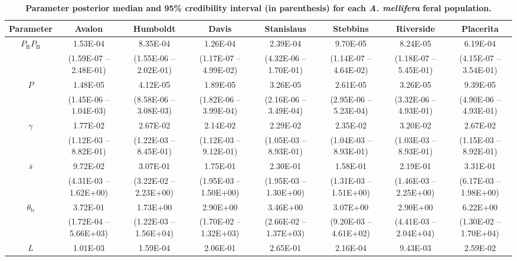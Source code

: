 \documentclass[a4paper, 12pt]{article}
\begin{document}
 \begin{table}
 \begin{small}
 \caption{\textbf{\small Parameter posterior median and 95\% credibility interval (in parenthesis) for each  \textit{A. mellifera} feral population.}}
 \end{small}
   \begin{tiny}
    \begin{tabular}{cccccccc}
    \cmidrule(r){1-8}
        Parameter & Avalon & Humboldt & Davis & Stanislaus & Stebbins & Riverside & Placerita \\
        \midrule
        $P_\mathrm{R}P_\mathrm{B}$  & 1.53E-04 & 8.35E-04 & 1.26E-04 & 2.39E-04 & 9.70E-05 & 8.24E-05 & 6.19E-04 \\
         & (1.59E-07 – 2.48E-01) & (1.55E-06 – 2.02E-01) & (1.17E-07 – 4.99E-02) & (4.32E-06 – 1.70E-01) & (1.14E-07 – 4.64E-02) & (1.18E-07 – 5.45E-01) & (4.15E-07 – 3.54E-01) \\
        $P$ & 1.48E-05 & 4.12E-05 & 1.89E-05 & 3.26E-05 & 2.61E-05 & 3.26E-05 & 9.39E-05 \\
         & (1.45E-06 – 1.04E-03) & (8.58E-06 – 3.08E-03) & (1.82E-06 – 3.99E-04) & (2.16E-06 – 3.49E-04) & (2.95E-06 – 5.23E-04) & (3.32E-06 – 4.93E-01) & (4.90E-06 – 4.93E-01) \\
        $\gamma$ & 1.77E-02 & 2.67E-02 & 2.14E-02 & 2.29E-02 & 2.35E-02 & 3.20E-02 & 2.67E-02 \\
         & (1.12E-03 – 8.82E-01) & (1.22E-03 – 8.45E-01) & (1.12E-03 – 9.12E-01) & (1.05E-03 – 8.93E-01) & (1.04E-03 – 8.93E-01) & (1.03E-03 – 8.93E-01) & (1.15E-03 – 8.92E-01) \\
        $\bar{s}$ & 9.72E-02 & 3.07E-01 & 1.75E-01 & 2.30E-01 & 1.58E-01 & 2.19E-01 & 3.31E-01 \\
         & (4.31E-03 – 1.62E+00) & (3.22E-02 – 2.23E+00) & (1.95E-03 – 1.50E+00) & (1.95E-03 – 1.30E+00) & (1.31E-03 – 1.51E+00) & (1.46E-03 – 2.25E+00) & (6.17E-03 – 1.98E+00) \\
        $\theta_{\mathrm{b}}$ & 3.72E-01 & 1.73E+00 & 2.90E+00 & 3.46E+00 & 3.07E+00 & 2.90E+00 & 6.22E+00 \\
         & (1.72E-04 – 5.66E+03) & (1.22E-03 – 1.56E+04) & (1.70E-02 – 1.32E+03) & (2.66E-02 – 1.37E+03) & (9.20E-03 – 4.61E+02) & (4.41E-03 – 2.04E+04) & (1.30E-02 – 1.70E+04) \\
        $L$ & 1.01E-03 & 1.59E-04 & 2.06E-01 & 2.65E-01 & 2.16E-04 & 9.43E-03 & 2.59E-02 \\

\end{tabular}
\end{tiny}
\end{table}
\end{document}
